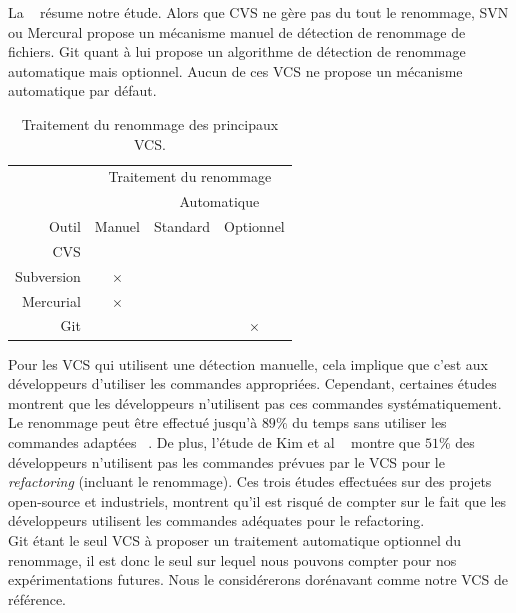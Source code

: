 La ~ résume notre étude. Alors que CVS ne gère pas du tout le renommage, SVN ou Mercural propose un mécanisme manuel de détection de renommage de fichiers. Git quant à lui propose un algorithme de détection de renommage automatique mais optionnel. Aucun de ces VCS ne propose un mécanisme automatique par défaut.\\ 


\begin{table}[h]
\centering
\begin{tabular}{rccc}
\toprule
 & \multicolumn{3}{c}{Traitement du renommage}\\
\cmidrule{2-4}
& & \multicolumn{2}{c}{Automatique}\\
\cmidrule{3-4}
Outil & Manuel & Standard & Optionnel\\
\midrule
CVS & & &\\
Subversion & $\times$ & &\\
Mercurial & $\times$ & &\\
Git & & & $\times$\\
\bottomrule
\end{tabular}
\caption{Traitement du renommage des principaux VCS.}
\label{tab:vcs}
\end{table}

Pour les VCS qui utilisent une détection manuelle, cela implique que c'est aux développeurs d'utiliser les commandes appropriées. Cependant, certaines études montrent que les développeurs n'utilisent pas ces commandes systématiquement. Le renommage peut être effectué jusqu'à $89\%$ du temps sans utiliser les commandes adaptées ~\cite{lavoie_inferring_2012,steidl_incremental_2014}. De plus, l'étude de Kim et al ~\cite{kim_field_2012} montre que $51$\% des développeurs n'utilisent pas les commandes prévues par le VCS pour le \textit{refactoring} (incluant le renommage). Ces trois études effectuées sur des projets open-source et industriels, montrent qu'il est risqué de compter sur le fait que les développeurs utilisent les commandes adéquates pour le refactoring.\\

Git étant le seul VCS à proposer un traitement automatique optionnel du renommage, il est donc le seul sur lequel nous pouvons compter pour nos expérimentations futures. Nous le considérerons dorénavant comme notre VCS de référence. 

